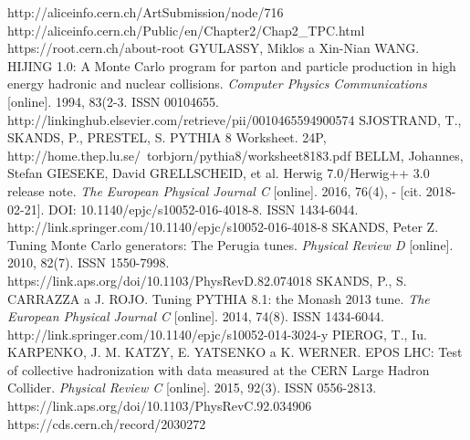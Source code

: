 \documentclass[thesismargins, thesislinespacing]{rnthesis}
\begin{document}
\begin{thebibliography}{}
http://aliceinfo.cern.ch/ArtSubmission/node/716
http://aliceinfo.cern.ch/Public/en/Chapter2/Chap2\_TPC.html
https://root.cern.ch/about-root 
GYULASSY, Miklos a Xin-Nian WANG. HIJING 1.0: A Monte Carlo program for parton and particle production in high energy hadronic and nuclear collisions. \textit{Computer Physics Communications} [online]. 1994, 83(2-3. ISSN 00104655. http://linkinghub.elsevier.com/retrieve/pii/0010465594900574
SJOSTRAND, T., SKANDS, P., PRESTEL, S. PYTHIA 8 Worksheet. 24P, http://home.thep.lu.se/~torbjorn/pythia8/worksheet8183.pdf
BELLM, Johannes, Stefan GIESEKE, David GRELLSCHEID, et al. Herwig 7.0/Herwig++ 3.0 release note. \textit{The European Physical Journal C} [online]. 2016, 76(4), - [cit. 2018-02-21]. DOI: 10.1140/epjc/s10052-016-4018-8. ISSN 1434-6044. http://link.springer.com/10.1140/epjc/s10052-016-4018-8
SKANDS, Peter Z. Tuning Monte Carlo generators: The Perugia tunes. \textit{Physical Review D }[online]. 2010, 82(7). ISSN 1550-7998. https://link.aps.org/doi/10.1103/PhysRevD.82.074018
SKANDS, P., S. CARRAZZA a J. ROJO. Tuning PYTHIA 8.1: the Monash 2013 tune. \textit{The European Physical Journal C} [online]. 2014, 74(8). ISSN 1434-6044. http://link.springer.com/10.1140/epjc/s10052-014-3024-y
PIEROG, T., Iu. KARPENKO, J. M. KATZY, E. YATSENKO a K. WERNER. EPOS LHC: Test of collective hadronization with data measured at the CERN Large Hadron Collider. \textit{Physical Review C} [online]. 2015, 92(3). ISSN 0556-2813.
 https://link.aps.org/doi/10.1103/PhysRevC.92.034906
 https://cds.cern.ch/record/2030272
\end{thebibliography}
%
\end{document}
